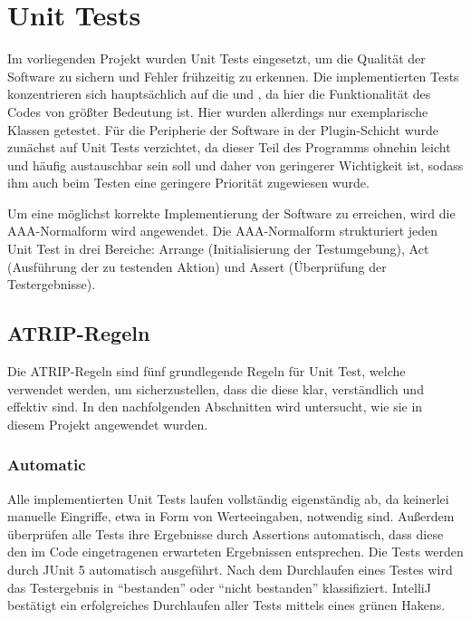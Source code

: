 \chapter{Unit Tests}

Im vorliegenden Projekt wurden Unit Tests eingesetzt, um die Qualität der Software zu sichern und Fehler frühzeitig zu erkennen. Die implementierten Tests konzentrieren sich hauptsächlich auf die \href{https://github.com/MichaelaHaag/RezeptApp/blob/main/3-Domain-Code/src/test/java/de/rezeptapp/domain/Rezept}{} und \href{https://github.com/MichaelaHaag/RezeptApp/tree/main/1-Adapter/src/test/java/de/rezeptapp/adapter/Datenpersistenz}{}, da hier die Funktionalität des Codes von größter Bedeutung ist. Hier wurden allerdings nur exemplarische Klassen getestet. Für die Peripherie der Software in der Plugin-Schicht wurde zunächst auf Unit Tests verzichtet, da dieser Teil des Programms ohnehin leicht und häufig austauschbar sein soll und daher von geringerer Wichtigkeit ist, sodass ihm auch beim Testen eine geringere Priorität zugewiesen wurde.

Um eine möglichst korrekte Implementierung der Software zu erreichen, wird die AAA-Normalform wird angewendet. Die AAA-Normalform strukturiert jeden Unit Test in drei Bereiche: Arrange (Initialisierung der Testumgebung), Act (Ausführung der zu testenden Aktion) und Assert (Überprüfung der Testergebnisse).

\section{ATRIP-Regeln}

Die ATRIP-Regeln sind fünf grundlegende Regeln für Unit Test, welche verwendet werden, um sicherzustellen, dass die diese klar, verständlich und effektiv sind. In den nachfolgenden Abschnitten wird untersucht, wie sie in diesem Projekt angewendet wurden.

\subsection{Automatic}

Alle implementierten Unit Tests laufen vollständig eigenständig ab, da keinerlei manuelle Eingriffe, etwa in Form von Werteeingaben, notwendig sind. Außerdem überprüfen alle Tests ihre Ergebnisse durch Assertions automatisch, dass diese den im Code eingetragenen erwarteten Ergebnissen entsprechen. Die Tests werden durch JUnit 5 automatisch ausgeführt. Nach dem Durchlaufen eines Testes wird das Testergebnis in \enquote{bestanden} oder \enquote{nicht bestanden} klassifiziert. IntelliJ bestätigt ein erfolgreiches Durchlaufen aller Tests mittels eines grünen Hakens.

